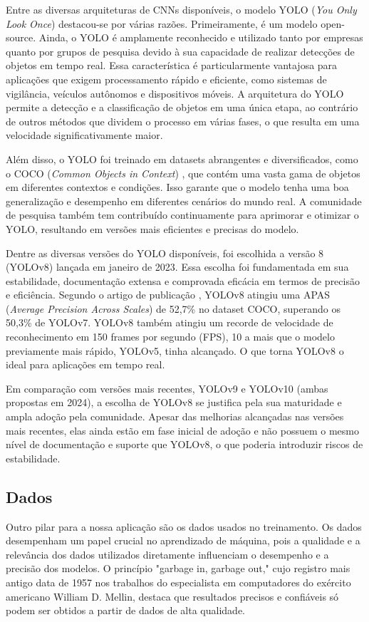 \documentclass[journal]{IEEEtran}
\begin{document}
Entre as diversas arquiteturas de CNNs disponíveis, o modelo YOLO (\textit{You Only Look Once}) \cite{redmon2016you} destacou-se por várias razões. Primeiramente, é um modelo open-source. Ainda, o YOLO é amplamente reconhecido e utilizado tanto por empresas quanto por grupos de pesquisa devido à sua capacidade de realizar detecções de objetos em tempo real. Essa característica é particularmente vantajosa para aplicações que exigem processamento rápido e eficiente, como sistemas de vigilância, veículos autônomos e dispositivos móveis. A arquitetura do YOLO permite a detecção e a classificação de objetos em uma única etapa, ao contrário de outros métodos que dividem o processo em várias fases, o que resulta em uma velocidade significativamente maior.

Além disso, o YOLO foi treinado em datasets abrangentes e diversificados, como o COCO (\textit{Common Objects in Context}) \cite{lin2014microsoft}, que contém uma vasta gama de objetos em diferentes contextos e condições. Isso garante que o modelo tenha uma boa generalização e desempenho em diferentes cenários do mundo real. A comunidade de pesquisa também tem contribuído continuamente para aprimorar e otimizar o YOLO, resultando em versões mais eficientes e precisas do modelo.

Dentre as diversas versões do YOLO disponíveis, foi escolhida a versão 8 (YOLOv8) lançada em janeiro de 2023. Essa escolha foi fundamentada em sua estabilidade, documentação extensa e comprovada eficácia em termos de precisão e eficiência. Segundo o artigo de publicação \cite{varghese2024yolov8}, YOLOv8 atingiu uma APAS (\textit{Average Precision Across Scales}) de 52,7\% no dataset COCO, superando os 50,3\% de YOLOv7. YOLOv8 também atingiu um recorde de velocidade de reconhecimento em 150 frames por segundo (FPS), 10 a mais que o modelo previamente mais rápido, YOLOv5, tinha alcançado. O que torna YOLOv8 o ideal para aplicações em tempo real.

Em comparação com versões mais recentes, YOLOv9 e YOLOv10 (ambas propostas em 2024), a escolha de YOLOv8 se justifica pela sua maturidade e ampla adoção pela comunidade. Apesar das melhorias alcançadas nas versões mais recentes, elas ainda estão em fase inicial de adoção e não possuem o mesmo nível de documentação e suporte que YOLOv8, o que poderia introduzir riscos de estabilidade.

\subsection{Dados}
\label{sec:data}
Outro pilar para a nossa aplicação são os dados usados no treinamento. Os dados desempenham um papel crucial no aprendizado de máquina, pois a qualidade e a relevância dos dados utilizados diretamente influenciam o desempenho e a precisão dos modelos. O princípio "garbage in, garbage out," cujo registro mais antigo data de 1957 nos trabalhos do especialista em computadores do exército americano William D. Mellin, destaca que resultados precisos e confiáveis só podem ser obtidos a partir de dados de alta qualidade.
\end{document}
